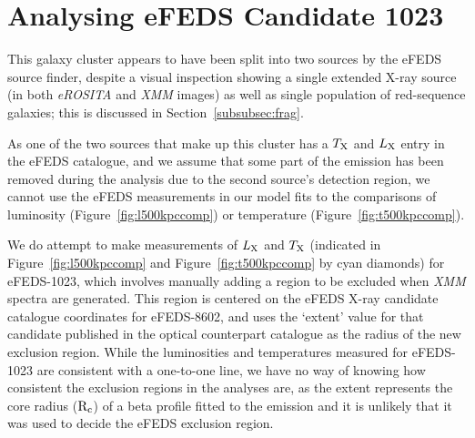 \documentclass[fleqn,usenatbib]{mnras}
\begin{document}








\appendix

\section{Analysing \lowercase{e}FEDS Candidate 1023}
\label{app:split_cluster}

This galaxy cluster appears to have been split into two sources by the eFEDS source finder, despite a visual inspection showing a single extended X-ray source (in both {\em eROSITA} and {\em XMM} images) as well as single population of red-sequence galaxies; this is discussed in Section~\ref{subsubsec:frag}.

As one of the two sources that make up this cluster has a $T_{\rm{X}}$ and $L_{\rm{X}}$ entry in the eFEDS catalogue, and we assume that some part of the emission has been removed during the analysis due to the second source's detection region, we cannot use the eFEDS measurements in our model fits to the comparisons of luminosity (Figure~\ref{fig:l500kpccomp}) or temperature (Figure~\ref{fig:t500kpccomp}).

We do attempt to make measurements of $L_{\rm{X}}$ and $T_{\rm{X}}$ (indicated in Figure~\ref{fig:l500kpccomp} and Figure~\ref{fig:t500kpccomp} by cyan diamonds) for eFEDS-1023, which involves manually adding a region to be excluded when {\em XMM} spectra are generated. This region is centered on the eFEDS X-ray candidate catalogue coordinates for eFEDS-8602, and uses the `extent' value for that candidate published in the optical counterpart catalogue as the radius of the new exclusion region. While the luminosities and temperatures measured for eFEDS-1023 are consistent with a one-to-one line, we have no way of knowing how consistent the exclusion regions in the analyses are, as the extent represents the core radius ($\rm{R}_{\rm{c}}$) of a beta profile fitted to the emission \citep[][]{efedsclusteropticalcat} and it is unlikely that it was used to decide the eFEDS exclusion region. 
\end{document}
